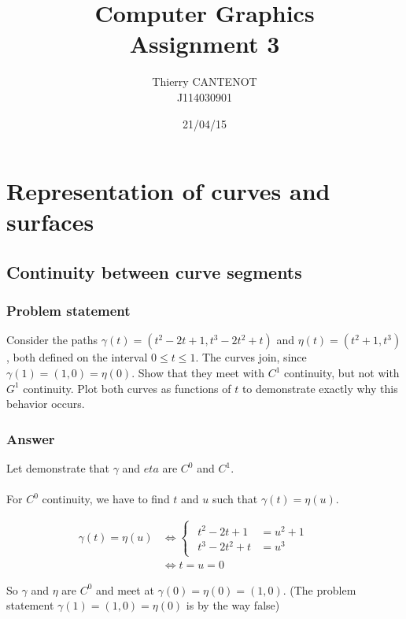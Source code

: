 \documentclass[a4paper,10pt]{article}
\title{\textbf{Computer Graphics} \\ Assignment 3}
\author{Thierry CANTENOT \\ J114030901}
\date{21/04/15}
\begin{document}
\maketitle

\section{Representation of curves and surfaces}
\bigskip

\subsection{Continuity between curve segments}
\bigskip

\subsubsection{Problem statement}
\bigskip

Consider the paths
$\gamma(t)=(t^2-2t+1, t^3-2t^2+t)$ and $\eta(t)=(t^2+1, t^3)$,
both defined on the interval $0 \leq t \leq 1$. The curves join, since $\gamma(1)=(1, 0)= \eta(0)$. Show that they meet with $C^1$ continuity, but not with $G^1$ continuity. Plot both curves as functions of $t$ to demonstrate exactly why this behavior occurs.

\subsubsection{Answer}
\bigskip

Let demonstrate that $\gamma$ and $eta$ are $C^0$ and $C^1$. \\\\
\noindent
For $C^0$ continuity, we have to find $t$ and $u$ such that $\gamma(t) = \eta(u)$.

\begin{equation}
\left.\begin{aligned}
\gamma(t) = \eta(u) &\iff
  \left\{\begin{array}{lr}
  	\left.\begin{aligned}
    t^2 - 2t + 1	   &= u^2 + 1&\\
    t^3 - 2t^2 + t &= u^3&
    \end{aligned}\right.
  \end{array}\right.& \\
  &\iff
  t = u = 0
\end{aligned}\right.
\end{equation}

\noindent
So $\gamma$ and $\eta$ are $C^0$ and meet at $\gamma(0) = \eta(0) = (1, 0)$. (The problem statement $\gamma(1)=(1, 0)= \eta(0)$ is by the way false) \\\\
\end{document}
